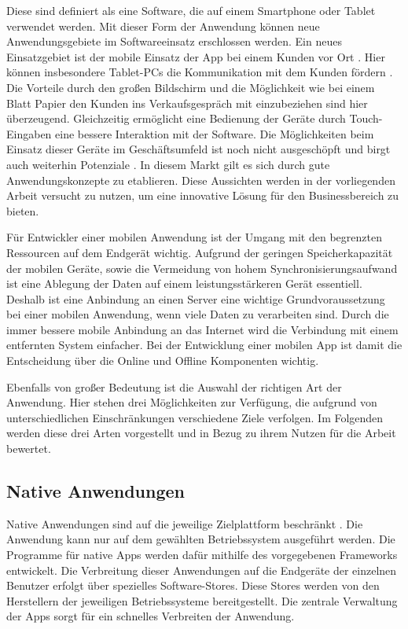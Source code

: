 Diese sind definiert als eine Software, die auf einem Smartphone oder Tablet verwendet werden. Mit dieser Form der Anwendung können neue Anwendungsgebiete im Softwareeinsatz erschlossen werden. Ein neues Einsatzgebiet ist der mobile Einsatz der App bei einem Kunden vor Ort \cite{bib:mobileMarketing}. Hier können insbesondere Tablet-PCs die Kommunikation mit dem Kunden fördern \cite{bib:tableVertrieb}. Die Vorteile durch den großen Bildschirm und die Möglichkeit wie bei einem Blatt Papier den Kunden ins Verkaufsgespräch mit einzubeziehen sind hier überzeugend. Gleichzeitig ermöglicht eine Bedienung der Geräte durch Touch-Eingaben eine bessere Interaktion mit der Software. Die Möglichkeiten beim Einsatz dieser Geräte im Geschäftsumfeld ist noch nicht ausgeschöpft und birgt auch weiterhin Potenziale \cite[Fazit]{bib:mobileMarketing2}. In diesem Markt gilt es sich durch gute Anwendungskonzepte zu etablieren. Diese Aussichten werden in der vorliegenden Arbeit versucht zu nutzen, um eine innovative Lösung für den Businessbereich zu bieten.\par

Für Entwickler einer mobilen Anwendung ist der Umgang mit den begrenzten Ressourcen auf dem Endgerät wichtig. 
Aufgrund der geringen Speicherkapazität der mobilen Geräte, sowie die Vermeidung von hohem Synchronisierungsaufwand ist eine Ablegung der Daten auf einem leistungsstärkeren Gerät essentiell. Deshalb ist eine Anbindung an einen Server eine wichtige Grundvoraussetzung bei einer mobilen Anwendung, wenn viele Daten zu verarbeiten sind.  Durch die immer bessere mobile Anbindung an das Internet wird die Verbindung mit einem entfernten System einfacher. Bei der Entwicklung einer mobilen App ist damit die Entscheidung über die Online und Offline Komponenten wichtig.
\par 
Ebenfalls von großer Bedeutung ist die Auswahl der richtigen Art der Anwendung. Hier stehen drei Möglichkeiten zur Verfügung, die aufgrund von unterschiedlichen Einschränkungen verschiedene Ziele verfolgen. Im Folgenden werden diese drei Arten vorgestellt und in Bezug zu ihrem Nutzen für die Arbeit bewertet.

\subsection{Native Anwendungen}
Native Anwendungen sind auf die jeweilige Zielplattform beschränkt \cite{bib:mobilePlattform}. Die Anwendung kann nur auf dem gewählten Betriebssystem ausgeführt werden. Die Programme für native Apps werden dafür mithilfe des vorgegebenen Frameworks entwickelt. Die Verbreitung dieser Anwendungen auf die Endgeräte der einzelnen Benutzer erfolgt über spezielles Software-Stores. Diese Stores werden von den Herstellern der jeweiligen Betriebssysteme bereitgestellt. Die zentrale Verwaltung der Apps sorgt für ein schnelles Verbreiten der Anwendung. \par

